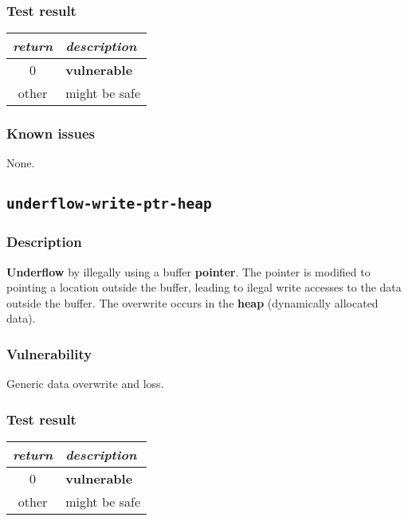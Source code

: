 \documentclass[a4paper]{book}
\begin{document}
\subsubsection{Test result}

\begin{tabular}{cl}
  \toprule
  \emph{return}  & \emph{description} \\
  \midrule
  0              & \textbf{vulnerable} \\
  other          & might be safe \\
  \bottomrule
\end{tabular}

\subsubsection{Known issues}

None.

\newpage


\subsection{\texttt{underflow-write-ptr-heap}}\label{test-underflow-write-ptr-heap}

\subsubsection{Description}

\textbf{Underflow} by illegally using a buffer \textbf{pointer}.
The pointer is modified to pointing a location outside the buffer,
leading to ilegal write accesses to the data outside the buffer.
The overwrite occurs in the \textbf{heap} (dynamically allocated data).

\subsubsection{Vulnerability}
Generic data overwrite and loss.

\subsubsection{Test result}

\begin{tabular}{cl}
  \toprule
  \emph{return}  & \emph{description} \\
  \midrule
  0              & \textbf{vulnerable} \\
  other          & might be safe \\
  \bottomrule
\end{tabular}
\end{document}
